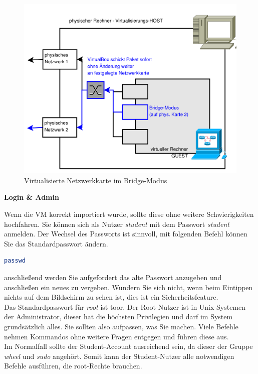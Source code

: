\documentclass[paper=a4,fontsize=11pt]{scrartcl}%
\numberwithin{equation}{section}
\begin{document}
\begin{figure}[H]
\centering
\includegraphics[scale=0.35]{vbox6}
\caption{Virtualisierte Netzwerkkarte im Bridge-Modus}
\end{figure}

\begin{center}
\Large{\textbf{Login \& Admin}}
\end{center}
Wenn die VM korrekt importiert wurde, sollte diese ohne weitere Schwierigkeiten hochfahren. Sie können sich als Nutzer \emph{student} mit dem Passwort \emph{student} anmelden. Der Wechsel des Passworts ist sinnvoll, mit folgenden Befehl können Sie das Standardpasswort ändern.
\begin{lstlisting}[style=Bash, language=Bash]
passwd
\end{lstlisting}
anschließend werden Sie aufgefordert das alte Passwort anzugeben und anschließen ein neues zu vergeben. Wundern Sie sich nicht, wenn beim Eintippen nichts auf dem Bildschirm zu sehen ist, dies ist ein Sicherheitsfeature.\\
Das Standardpasswort für \emph{root} ist toor. Der Root-Nutzer ist in Unix-Systemen der Administrator, dieser hat die höchsten Privilegien und darf im System grundsätzlich alles. Sie sollten also aufpassen, was Sie machen. Viele Befehle nehmen Kommandos ohne weitere Fragen entgegen und führen diese aus.\\
Im Normalfall sollte der Student-Account ausreichend sein, da dieser der Gruppe \emph{wheel} und \emph{sudo} angehört. Somit kann der Student-Nutzer alle notwendigen Befehle ausführen, die root-Rechte brauchen.
\end{document}
